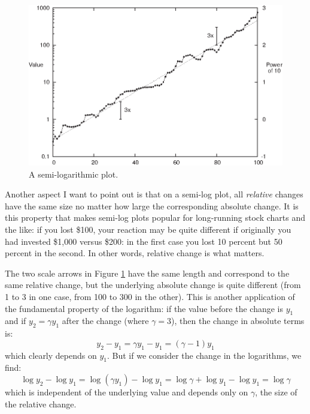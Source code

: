 \begin{figure}
  \centerline{\includegraphics{img/semilog}}
  \caption{A semi-logarithmic plot.}
  \label{fig:semilog}
\end{figure}

Another aspect I want to point out is that on a semi-log plot, all
\emph{relative} changes have the same size no matter how large the
corresponding absolute change. It is this property that makes semi-log
plots popular for long-running stock charts and the like: if you lost
\$100, your reaction may be quite different if originally you had
invested \$1,000 versus \$200: in the first case you lost 10 percent
but 50 percent in the second. In other words, relative change is what
matters.

The two scale arrows in Figure \ref{fig:semilog} have the same length
and correspond to the same relative change, but the underlying
absolute change is quite different (from 1 to 3 in one case, from 100
to 300 in the other). This  is another application of the fundamental
property of the logarithm: if the value before the change is $y_1$ and
if $y_2 = \gamma y_1$ after the change (where $\gamma = 3$), then the
change in absolute terms is:
%
\[
y_2 - y_1 = \gamma y_1 - y_1 = (\gamma - 1) y_1
\]
%
which clearly depends on $y_1$. But if we consider the change
in the logarithms, we find:
%
\[
\log y_2 - \log y_1 
  = \log( \gamma y_1 ) - \log y_1 
  = \log \gamma + \log y_1 - \log y_1
  = \log \gamma
\]
%
which is independent of the underlying value and depends only
on $\gamma$, the size of the relative change.

